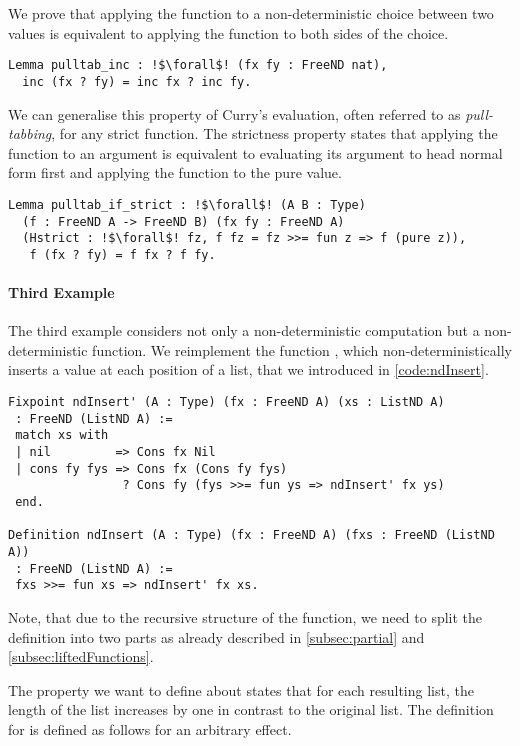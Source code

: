 We prove that applying the function  to a non\--deterministic choice between two values is equivalent to applying the function to both sides of the choice.

\begin{verbatim}
Lemma pulltab_inc : !$\forall$! (fx fy : FreeND nat),
  inc (fx ? fy) = inc fx ? inc fy.
\end{verbatim}

We can generalise this property of Curry's evaluation, often referred to as \emph{pull\--tabbing}, for any strict function.
The strictness property states that applying the function to an argument is equivalent to evaluating its argument to head normal form first and applying the function to the pure value.

\begin{verbatim}
Lemma pulltab_if_strict : !$\forall$! (A B : Type)
  (f : FreeND A -> FreeND B) (fx fy : FreeND A)
  (Hstrict : !$\forall$! fz, f fz = fz >>= fun z => f (pure z)),
   f (fx ? fy) = f fx ? f fy.
\end{verbatim}

\paragraph{Third Example}
The third example considers not only a non\--deterministic computation but a non\--deterministic function.
We reimplement the function , which non\--deterministically inserts a value at each position of a list, that we introduced in \autoref{code:ndInsert}.

\begin{verbatim}
Fixpoint ndInsert' (A : Type) (fx : FreeND A) (xs : ListND A)
 : FreeND (ListND A) :=
 match xs with
 | nil         => Cons fx Nil
 | cons fy fys => Cons fx (Cons fy fys)
                ? Cons fy (fys >>= fun ys => ndInsert' fx ys)
 end.

Definition ndInsert (A : Type) (fx : FreeND A) (fxs : FreeND (ListND A))
 : FreeND (ListND A) :=
 fxs >>= fun xs => ndInsert' fx xs.
\end{verbatim}

Note, that due to the recursive structure of the function, we need to split the definition into two parts as already described in \autoref{subsec:partial} and \autoref{subsec:liftedFunctions}.

The property we want to define about  states that for each resulting list, the length of the list increases by one in contrast to the original list.
The definition for  is defined as follows for an arbitrary effect.

